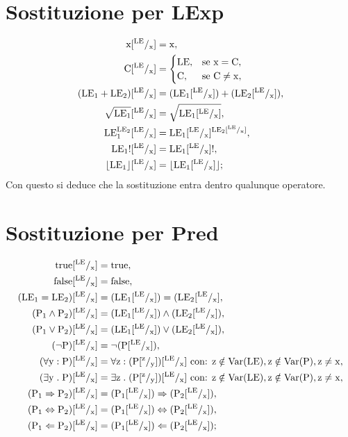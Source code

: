 \documentclass[a4paper, 12pt, oneside,fleqn]{book}
\begin{document}
\section{Sostituzione per LExp}
\begin{align*}
  \idx[^{\LE}/_\idx]
    &= \idx,\\
  \C[^{\LE}/_\idx]
    &=
      \begin{cases}
        \LE, &\text{se $\idx = \C$,} \\
        \C,  &\text{se $\C \neq \idx$},
      \end{cases} \\
(\LE_1 + \LE_2)[^{\LE}/_\idx] &= (\LE_1[^{\LE}/_\idx]) + (\LE_2[^{\LE}/_\idx]),\\
\sqrt{\LE_1}[^{\LE}/_\idx] &= \sqrt{{\LE_1}[^{\LE}/_\idx]},\\
\LE_1^{\LE{_2}}[^{\LE}/_\idx] &=\LE_1[^{\LE}/_\idx]^{\LE{_2}[^{\LE}/_\idx]},\\
{\LE_1}![^{\LE}/_\idx] &= {{\LE_1}[^{\LE}/_\idx]}!,\\
\lfloor \LE_1 \rfloor[^{\LE}/_\idx] &= \lfloor \LE_1[^{\LE}/_\idx] \rfloor;\\
\end{align*}
Con questo si deduce che la sostituzione entra dentro qualunque operatore.
\section{Sostituzione per Pred}
\begin{align*}
\true[^{\LE}/_\idx] &= \true,\\
\false[^{\LE}/_\idx] &= \false,\\
(\LE{_1} = \LE{_2})[^{\LE}/_\idx] &= (\LE{_1}[^{\LE}/_\idx]) = (\LE{_2}[^{\LE}/_\idx], \\
(\p{_1} \wedge \p{_2})[^{\LE}/_\idx] &= (\LE{_1}[^{\LE}/_\idx]) \wedge (\LE{_2}[^{\LE}/_\idx]),\\
(\p{_1} \vee \p{_2})[^{\LE}/_\idx] &= (\LE{_1}[^{\LE}/_\idx]) \vee (\LE{_2}[^{\LE}/_\idx]), \\
(\neg \p)[^{\LE}/_\idx] &= \neg(\p[^{\LE}/_\idx]),\\
(\forall\y\itc \p)[^{\LE}/_\idx] &= \forall \mathrm{z}\itc (\p[^\mathrm{z}/_\y])[^{\LE}/_\idx] \text{ con: }\mathrm{z}\notin\Var(\LE), \mathrm{z}\notin\Var(\p),\mathrm{z}\neq\idx, \\
(\exists \y\st \p)[^{\LE}/_\idx] &= \exists \mathrm{z}\st (\p[^\mathrm{z}/_\y])[^{\LE}/_\idx] \text{ con: }\mathrm{z}\notin\Var(\LE), \mathrm{z}\notin\Var(\p),\mathrm{z}\neq\idx,\\
(\p{_1} \Rightarrow \p{_2})[^{\LE}/_\idx] &= (\p{_1}[^{\LE}/_\idx]) \Rightarrow (\p{_2}[^{\LE}/_\idx]), \\
(\p{_1} \Leftrightarrow \p{_2})[^{\LE}/_\idx] &= (\p{_1}[^{\LE}/_\idx]) \Leftrightarrow (\p{_2}[^{\LE}/_\idx]), \\
(\p{_1} \Leftarrow \p{_2})[^{\LE}/_\idx] &= (\p{_1}[^{\LE}/_\idx]) \Leftarrow (\p{_2}[^{\LE}/_\idx]);
\end{align*}
\end{document}
